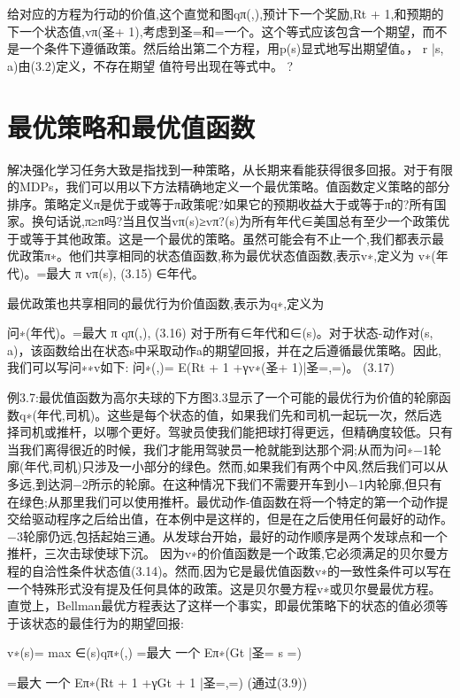 给对应的方程为行动的价值,这个直觉和图qπ(,),预计下一个奖励,Rt + 1,和预期的下一个状态值,vπ(圣+ 1),考虑到圣=和=一个。这个等式应该包含一个期望，而不是一个条件下遵循政策。然后给出第二个方程，用p(s)显式地写出期望值。， r |s, a)由(3.2)定义，不存在期望
值符号出现在等式中。 					?


\section{最优策略和最优值函数}

解决强化学习任务大致是指找到一种策略，从长期来看能获得很多回报。对于有限的MDPs，我们可以用以下方法精确地定义一个最优策略。值函数定义策略的部分排序。策略定义π是优于或等于π政策呢?如果它的预期收益大于或等于π的?所有国家。换句话说,π≥π吗?当且仅当vπ(s)≥vπ?(s)为所有年代∈美国总有至少一个政策优于或等于其他政策。这是一个最优的策略。虽然可能会有不止一个,我们都表示最优政策π∗。他们共享相同的状态值函数,称为最优状态值函数,表示v∗,定义为
v∗(年代)。=最大
π
vπ(s), 					(3.15)
∈年代。


最优政策也共享相同的最优行为价值函数,表示为q∗,定义为

问∗(年代)。=最大
π
qπ(,), 					(3.16)
对于所有∈年代和∈(s)。对于状态-动作对(s, a)，该函数给出在状态s中采取动作a的期望回报，并在之后遵循最优策略。因此,我们可以写问∗∗v如下:
问∗(,)= E(Rt + 1 +γv∗(圣+ 1)|圣=,=)。 					(3.17)

例3.7:最优值函数为高尔夫球的下方图3.3显示了一个可能的最优行为价值的轮廓函数q∗(年代,司机)。这些是每个状态的值，如果我们先和司机一起玩一次，然后选择司机或推杆，以哪个更好。驾驶员使我们能把球打得更远，但精确度较低。只有当我们离得很近的时候，我们才能用驾驶员一枪就能到达那个洞;从而为问∗−1轮廓(年代,司机)只涉及一小部分的绿色。然而,如果我们有两个中风,然后我们可以从多远,到达洞−2所示的轮廓。在这种情况下我们不需要开车到小−1内轮廓,但只有在绿色;从那里我们可以使用推杆。最优动作-值函数在将一个特定的第一个动作提交给驱动程序之后给出值，在本例中是这样的，但是在之后使用任何最好的动作。−3轮廓仍远,包括起始三通。从发球台开始，最好的动作顺序是两个发球点和一个推杆，三次击球使球下沉。
因为v∗的价值函数是一个政策,它必须满足的贝尔曼方程的自洽性条件状态值(3.14)。然而,因为它是最优值函数v∗的一致性条件可以写在一个特殊形式没有提及任何具体的政策。这是贝尔曼方程v∗或贝尔曼最优方程。直觉上，Bellman最优方程表达了这样一个事实，即最优策略下的状态的值必须等于该状态的最佳行为的期望回报:

v∗(s)= max
∈(s)qπ∗(,)
=最大
一个
Eπ∗(Gt |圣= s =)

=最大
一个
Eπ∗(Rt + 1 +γGt + 1 |圣=,=) 					(通过(3.9))

